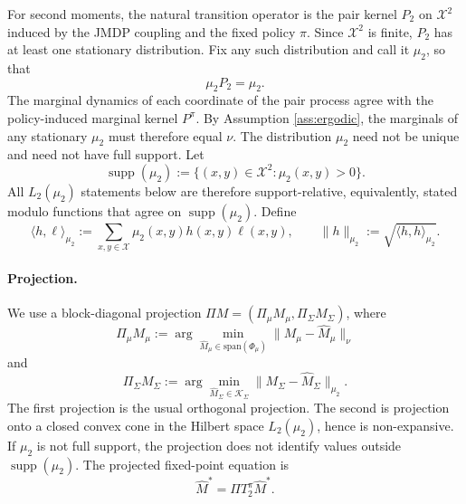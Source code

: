 \documentclass[accepted]{uai2026}
\theoremstyle{plain}
\theoremstyle{definition}
\theoremstyle{remark}
\newcommand{\1}{\mathbbm{1}}
\begin{document}
For second moments, the natural transition operator is the pair kernel $P_2$ on $\mathcal{X}^2$ induced by the JMDP coupling and the fixed policy $\pi$. Since $\mathcal{X}^2$ is finite, $P_2$ has at least one stationary distribution. Fix any such distribution and call it $\mu_2$, so that
\begin{equation}
\mu_2 P_2=\mu_2.
\end{equation}
The marginal dynamics of each coordinate of the pair process agree with the policy-induced marginal kernel $P^\pi$. By Assumption \ref{ass:ergodic}, the marginals of any stationary $\mu_2$ must therefore equal $\nu$. The distribution $\mu_2$ need not be unique and need not have full support. Let
\begin{equation}
\operatorname{supp}(\mu_2) := \{(x,y)\in\mathcal{X}^2:\mu_2(x,y)>0\}.
\end{equation}
All $L_2(\mu_2)$ statements below are therefore support-relative, equivalently, stated modulo functions that agree on $\operatorname{supp}(\mu_2)$. Define
\begin{equation}\label{eq:inner2}
\langle h,\ell\rangle_{\mu_2} := \sum_{x,y\in\mathcal{X}}\mu_2(x,y)h(x,y)\ell(x,y),\qquad \|h\|_{\mu_2}:=\sqrt{\langle h,h\rangle_{\mu_2}}.
\end{equation}

\paragraph{Projection.}
We use a block-diagonal projection $\Pi M = (\Pi_\mu M_\mu,\Pi_\Sigma M_\Sigma)$, where
\begin{equation}\label{eq:least-squares}
\Pi_\mu M_\mu := \arg\min_{\hat{M}_\mu\in\mathrm{span}(\Phi_\mu)}\|M_\mu-\hat{M}_\mu\|_\nu
\end{equation}
and
\begin{equation}\label{eq:psd-projection}
\Pi_\Sigma M_\Sigma := \arg\min_{\hat{M}_\Sigma\in\mathcal{K}_\Sigma}\|M_\Sigma-\hat{M}_\Sigma\|_{\mu_2}.
\end{equation}
The first projection is the usual orthogonal projection. The second is projection onto a closed convex cone in the Hilbert space $L_2(\mu_2)$, hence is non-expansive. If $\mu_2$ is not full support, the projection does not identify values outside $\operatorname{supp}(\mu_2)$. The projected fixed-point equation is
\begin{equation}\label{eq:projection}
  \hat{M}^\ast=\Pi T^\pi_2\hat{M}^\ast.
\end{equation}
\end{document}
